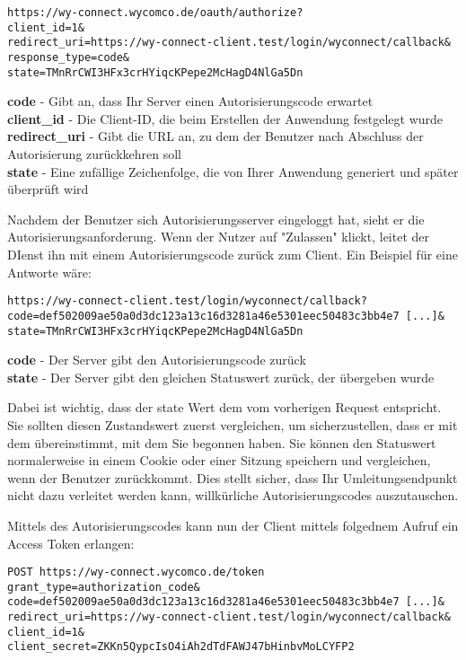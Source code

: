 \texttt{https://wy-connect.wycomco.de/oauth/authorize?\\
client\_id=1\& \\
redirect\_uri=https://wy-connect-client.test/login/wyconnect/callback\& \\
response\_type=code\& \\
state=TMnRrCWI3HFx3crHYiqcKPepe2McHagD4NlGa5Dn
}

\textbf{code} - Gibt an, dass Ihr Server einen Autorisierungscode erwartet \\
\textbf{client\_id} - Die Client-ID, die beim Erstellen der Anwendung festgelegt wurde \\
\textbf{redirect\_uri} - Gibt die URL an, zu dem der Benutzer nach Abschluss der Autorisierung zurückkehren soll \\
\textbf{state} - Eine zufällige Zeichenfolge, die von Ihrer Anwendung generiert und später überprüft wird

Nachdem der Benutzer sich Autorisierungsserver eingeloggt hat, sieht er die Autorisierungsanforderung. Wenn der Nutzer auf "Zulassen" klickt, leitet der DIenst ihn mit einem Autorisierungscode zurück zum Client. Ein Beispiel für eine Antworte wäre:

\texttt{https://wy-connect-client.test/login/wyconnect/callback?\\
code=def502009ae50a0d3dc123a13c16d3281a46e5301eec50483c3bb4e7 [...]\& \\
state=TMnRrCWI3HFx3crHYiqcKPepe2McHagD4NlGa5Dn
}

\textbf{code} - Der Server gibt den Autorisierungscode zurück \\
\textbf{state} - Der Server gibt den gleichen Statuswert zurück, der übergeben wurde

Dabei ist wichtig, dass der state Wert dem vom vorherigen Request entspricht. 
Sie sollten diesen Zustandswert zuerst vergleichen, um sicherzustellen, dass er mit dem übereinstimmt, mit dem Sie begonnen haben. Sie können den Statuswert normalerweise in einem Cookie oder einer Sitzung speichern und vergleichen, wenn der Benutzer zurückkommt. Dies stellt sicher, dass Ihr Umleitungsendpunkt nicht dazu verleitet werden kann, willkürliche Autorisierungscodes auszutauschen.

Mittels des Autorisierungscodes kann nun der Client mittels folgednem Aufruf ein Access Token erlangen: 

\texttt{POST https://wy-connect.wycomco.de/token \\
  grant\_type=authorization\_code\& \\
  code=def502009ae50a0d3dc123a13c16d3281a46e5301eec50483c3bb4e7 [...]\& \\
  redirect\_uri=https://wy-connect-client.test/login/wyconnect/callback\& \\
  client\_id=1\& \\
  client\_secret=ZKKn5QypcIsO4iAh2dTdFAWJ47bHinbvMoLCYFP2}
  
